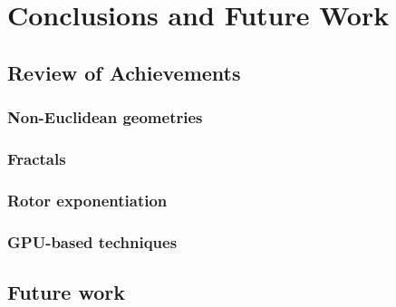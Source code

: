 \chapter{Conclusions and Future Work}

\section{Review of Achievements}

\subsection{Non-Euclidean geometries}

\subsection{Fractals}

\subsection{Rotor exponentiation}

\subsection{GPU-based techniques}

\section{Future work}
